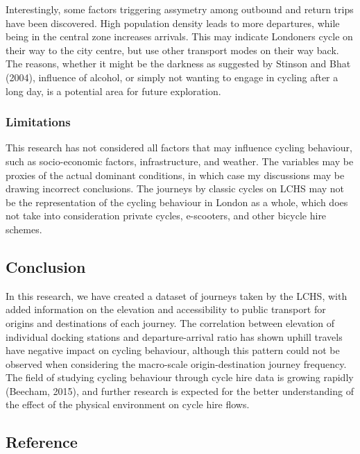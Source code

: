 \documentclass[
  a4paper,
  DIV=11,
  numbers=noendperiod]{scrartcl}
\begin{document}
Interestingly, some factors triggering assymetry among outbound and
return trips have been discovered. High population density leads to more
departures, while being in the central zone increases arrivals. This may
indicate Londoners cycle on their way to the city centre, but use other
transport modes on their way back. The reasons, whether it might be the
darkness as suggested by Stinson and Bhat (2004), influence of alcohol,
or simply not wanting to engage in cycling after a long day, is a
potential area for future exploration.

\hypertarget{limitations}{%
\subsubsection{Limitations}\label{limitations}}

This research has not considered all factors that may influence cycling
behaviour, such as socio-economic factors, infrastructure, and weather.
The variables may be proxies of the actual dominant conditions, in which
case my discussions may be drawing incorrect conclusions. The journeys
by classic cycles on LCHS may not be the representation of the cycling
behaviour in London as a whole, which does not take into consideration
private cycles, e-scooters, and other bicycle hire schemes.

\hypertarget{conclusion}{%
\subsection{Conclusion}\label{conclusion}}

In this research, we have created a dataset of journeys taken by the
LCHS, with added information on the elevation and accessibility to
public transport for origins and destinations of each journey. The
correlation between elevation of individual docking stations and
departure-arrival ratio has shown uphill travels have negative impact on
cycling behaviour, although this pattern could not be observed when
considering the macro-scale origin-destination journey frequency. The
field of studying cycling behaviour through cycle hire data is growing
rapidly (Beecham, 2015), and further research is expected for the better
understanding of the effect of the physical environment on cycle hire
flows.

\hypertarget{reference}{%
\subsection*{Reference}\label{reference}}
\end{document}
